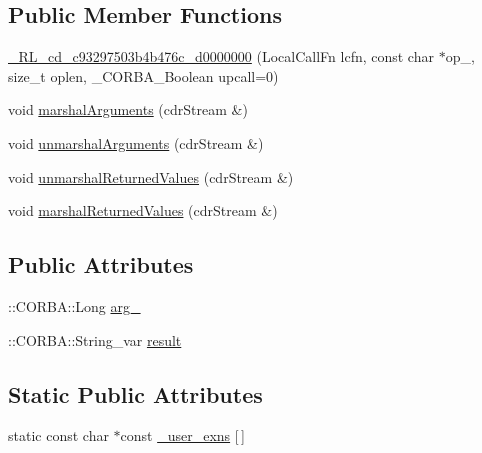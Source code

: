 \subsection*{Public Member Functions}
\begin{DoxyCompactItemize}
\item 
\hyperlink{class__0_r_l__cd__c93297503b4b476c__d0000000_adfa0c552b20d7a74a4ac468399094266}{\+\_\+R\+L\+\_\+cd\+\_\+c93297503b4b476c\+\_\+d0000000} (Local\+Call\+Fn lcfn, const char $\ast$op\+\_\+, size\+\_\+t oplen, \+\_\+\+C\+O\+R\+B\+A\+\_\+\+Boolean upcall=0)
\item 
void \hyperlink{class__0_r_l__cd__c93297503b4b476c__d0000000_a9ab3a00a9409f5b3c7a39f7202822419}{marshal\+Arguments} (cdr\+Stream \&)
\item 
void \hyperlink{class__0_r_l__cd__c93297503b4b476c__d0000000_ab9dfcf580415a9e3f925e724fd5afe1a}{unmarshal\+Arguments} (cdr\+Stream \&)
\item 
void \hyperlink{class__0_r_l__cd__c93297503b4b476c__d0000000_a4d49e0707d79223d0b13517125ed9cc1}{unmarshal\+Returned\+Values} (cdr\+Stream \&)
\item 
void \hyperlink{class__0_r_l__cd__c93297503b4b476c__d0000000_a276cc2d40feb9cd8ea0aa2956b164d6f}{marshal\+Returned\+Values} (cdr\+Stream \&)
\end{DoxyCompactItemize}
\subsection*{Public Attributes}
\begin{DoxyCompactItemize}
\item 
\+::C\+O\+R\+B\+A\+::\+Long \hyperlink{class__0_r_l__cd__c93297503b4b476c__d0000000_a3f9faa5564ca3e53589bb5523fdf15f2}{arg\+\_}
\item 
\+::C\+O\+R\+B\+A\+::\+String\+\_\+var \hyperlink{class__0_r_l__cd__c93297503b4b476c__d0000000_a85333e8615ac624f1ed70841d68adc3a}{result}
\end{DoxyCompactItemize}
\subsection*{Static Public Attributes}
\begin{DoxyCompactItemize}
\item 
static const char $\ast$const \hyperlink{class__0_r_l__cd__c93297503b4b476c__d0000000_aa32c9fe871a1a705e7e880c5220be36c}{\+\_\+user\+\_\+exns} \mbox{[}$\,$\mbox{]}
\end{DoxyCompactItemize}


